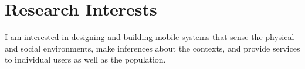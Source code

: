 \section{\sc Research Interests}
I am interested in designing and building mobile systems that sense
the physical and social environments, make inferences about the
contexts, and provide services to individual users as well as the
population.
